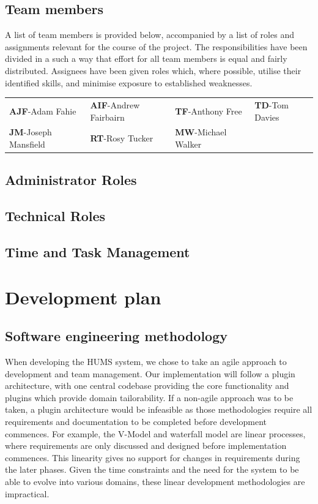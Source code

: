 \documentclass[10pt,a4paper]{article}
\begin{document}
\subsection{Team members}
A list of team members is provided below, accompanied by a list of roles and
assignments relevant for the course of the project. The responsibilities have
been divided in a such a way that effort for all team members is equal and
fairly distributed. Assignees have been given roles which, where possible,
utilise their identified skills, and minimise exposure to established
weaknesses.

\begin{tabular}{ p{4cm} p{4cm} p{4cm} p{4cm} }
	\textbf{AJF}-Adam Fahie & \textbf{AIF}-Andrew Fairbairn &
			\textbf{TF}-Anthony Free & \textbf{TD}-Tom Davies \\
	\textbf{JM}-Joseph Mansfield & \textbf{RT}-Rosy Tucker &
			\textbf{MW}-Michael Walker & \\
\end{tabular}
\subsection{Administrator Roles} 


\subsection{Technical Roles}


\subsection{Time and Task Management}


\section{Development plan}

\subsection{Software engineering methodology}
When developing the HUMS system, we chose to take an agile approach to
development and team management. Our implementation will follow a plugin
architecture, with one central codebase providing the core functionality and
plugins which provide domain tailorability. If a non-agile approach was to be
taken, a plugin architecture would be infeasible as those methodologies require
all requirements and documentation to be completed before development commences.
For example, the V-Model and waterfall model are linear processes, where
requirements are only discussed and designed before implementation commences.
This linearity gives no support for changes in requirements during the later
phases. Given the time constraints and the need for the system to be able to
evolve into various domains, these linear development methodologies are
impractical.
\end{document}
